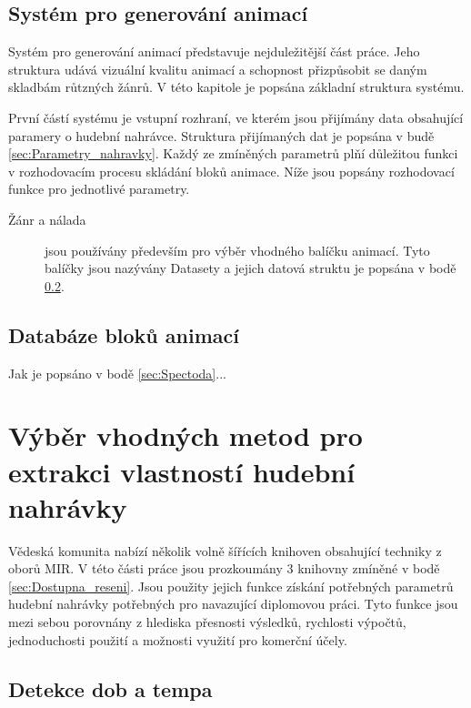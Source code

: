 \subsection{Systém pro generování animací} \label{sec:System_generovani_animaci}

Systém pro generování animací představuje nejduležitější část práce. Jeho struktura udává vizuální kvalitu animací a schopnost přizpůsobit se daným skladbám růtzných žánrů. V této kapitole je popsána základní struktura systému. 

První částí systému je vstupní rozhraní, ve kterém jsou přijímány data obsahující paramery o hudební nahrávce. Struktura přijímaných dat je popsána v budě \ref{sec:Parametry_nahravky}. Každý ze zmíněných parametrů plňí důležitou funkci v rozhodovacím procesu skládání bloků animace. Níže jsou popsány rozhodovací funkce pro jednotlivé parametry.

\begin{description}
    \item[Žánr a nálada] jsou používány především pro výběr vhodného balíčku animací. Tyto balíčky jsou nazývány Datasety a jejich datová struktu je popsána v bodě \ref{sec:Database_structure}.
\end{description}



\subsection{Databáze bloků animací} \label{sec:Database_structure}
Jak je popsáno v bodě \ref{sec:Spectoda}...



\section{Výběr vhodných metod pro extrakci vlastností hudební nahrávky} \label{sec:Exktrakce_vlastnosti_metody}

Vědeská komunita nabízí několik volně šířících knihoven obsahující techniky z oborů MIR. V této části práce jsou prozkoumány 3 knihovny zmíněné v bodě \ref{sec:Dostupna_reseni}. Jsou použity jejich funkce získání potřebných parametrů hudební nahrávky potřebných pro navazující diplomovou práci. Tyto funkce jsou mezi sebou porovnány z hlediska přesnosti výsledků, rychlosti výpočtů, jednoduchosti použití a možnosti využití pro komerční účely. 

\subsection{Detekce dob a tempa}

